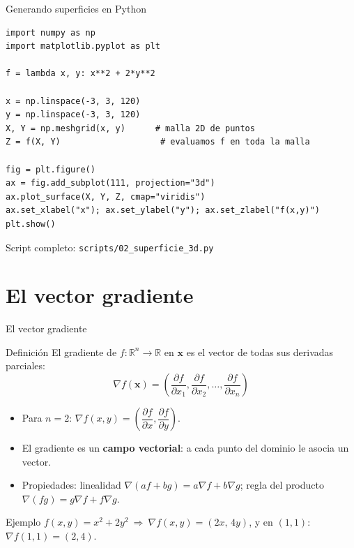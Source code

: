 \documentclass[aspectratio=169,10pt]{beamer}
\newcommand{\R}{\mathbb{R}}
\newcommand{\grad}{\nabla}
\newcommand{\x}{\mathbf{x}}
\begin{document}
\begin{frame}[fragile]{Generando superficies en Python}
\begin{lstlisting}
import numpy as np
import matplotlib.pyplot as plt

f = lambda x, y: x**2 + 2*y**2

x = np.linspace(-3, 3, 120)
y = np.linspace(-3, 3, 120)
X, Y = np.meshgrid(x, y)      # malla 2D de puntos
Z = f(X, Y)                    # evaluamos f en toda la malla

fig = plt.figure()
ax = fig.add_subplot(111, projection="3d")
ax.plot_surface(X, Y, Z, cmap="viridis")
ax.set_xlabel("x"); ax.set_ylabel("y"); ax.set_zlabel("f(x,y)")
plt.show()
\end{lstlisting}
  \small Script completo: \texttt{scripts/02\_superficie\_3d.py}
\end{frame}

\section{El vector gradiente}

\begin{frame}{El vector gradiente}
  \begin{block}{Definición}
    El gradiente de $f:\R^n\to\R$ en $\x$ es el vector de todas sus
    derivadas parciales:
    \[
      \grad f(\x) = \left(
        \frac{\partial f}{\partial x_1}, \frac{\partial f}{\partial x_2},
        \dots, \frac{\partial f}{\partial x_n}
      \right)
    \]
  \end{block}
  \begin{itemize}
    \item Para $n=2$: $\grad f(x,y) = \left(\dfrac{\partial f}{\partial x},
      \dfrac{\partial f}{\partial y}\right)$.
    \item El gradiente es un \textbf{campo vectorial}: a cada punto del
      dominio le asocia un vector.
    \item Propiedades: linealidad $\grad(af+bg)=a\grad f + b\grad g$;
      regla del producto $\grad(fg) = g\grad f + f\grad g$.
  \end{itemize}
  \begin{exampleblock}{Ejemplo}
    $f(x,y)=x^2+2y^2 \ \Rightarrow\ \grad f(x,y) = (2x,\,4y)$, y en
    $(1,1)$: $\grad f(1,1) = (2,4)$.
  \end{exampleblock}
\end{frame}
\end{document}
